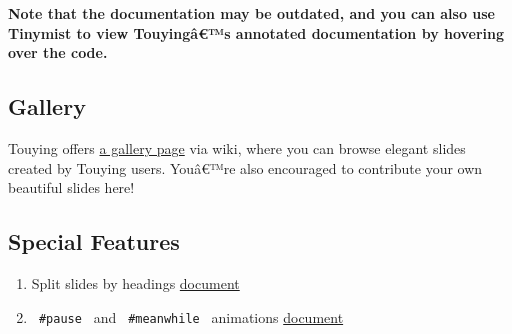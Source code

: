 \textbf{Note that the documentation may be outdated, and you can also
use Tinymist to view Touyingâ€™s annotated documentation by hovering
over the code.}

\subsection{Gallery}\label{gallery}

Touying offers \href{https://github.com/touying-typ/touying/wiki}{a
gallery page} via wiki, where you can browse elegant slides created by
Touying users. Youâ€™re also encouraged to contribute your own beautiful
slides here!

\subsection{Special Features}\label{special-features}

\begin{enumerate}
\tightlist
\item
  Split slides by headings
  \href{https://touying-typ.github.io/docs/sections}{document}
\end{enumerate}

\begin{Shaded}
\begin{Highlighting}[]





\end{Highlighting}
\end{Shaded}

\begin{enumerate}
\setcounter{enumi}{1}
\tightlist
\item
  \texttt{\ \#pause\ } and \texttt{\ \#meanwhile\ } animations
  \href{https://touying-typ.github.io/docs/dynamic/simple}{document}
\end{enumerate}

\begin{Shaded}
\begin{Highlighting}[]
\NormalTok{\#slide[}






\NormalTok{]}
\end{Highlighting}
\end{Shaded}

